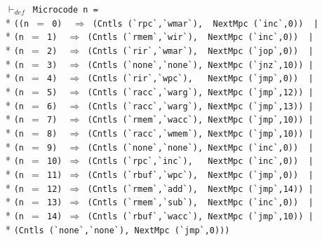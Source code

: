 \begin{normalsize}
\hspace*{\fill}
\begin{minipage}{17cm}
$\vdash_{def}$\verb" Microcode n ="\\*
\verb"((n "$=$\verb" 0)  "$\Rightarrow$\verb" (Cntls (`rpc`,`wmar`),  NextMpc (`inc`,0))  |"\\*
\verb"(n "$=$\verb" 1)  "$\Rightarrow$\verb" (Cntls (`rmem`,`wir`),  NextMpc (`inc`,0))  |"\\*
\verb"(n "$=$\verb" 2)  "$\Rightarrow$\verb" (Cntls (`rir`,`wmar`),  NextMpc (`jop`,0))  |"\\*
\verb"(n "$=$\verb" 3)  "$\Rightarrow$\verb" (Cntls (`none`,`none`), NextMpc (`jnz`,10)) |"\\*
\verb"(n "$=$\verb" 4)  "$\Rightarrow$\verb" (Cntls (`rir`,`wpc`),   NextMpc (`jmp`,0))  |"\\*
\verb"(n "$=$\verb" 5)  "$\Rightarrow$\verb" (Cntls (`racc`,`warg`), NextMpc (`jmp`,12)) |"\\*
\verb"(n "$=$\verb" 6)  "$\Rightarrow$\verb" (Cntls (`racc`,`warg`), NextMpc (`jmp`,13)) |"\\*
\verb"(n "$=$\verb" 7)  "$\Rightarrow$\verb" (Cntls (`rmem`,`wacc`), NextMpc (`jmp`,10)) |"\\*
\verb"(n "$=$\verb" 8)  "$\Rightarrow$\verb" (Cntls (`racc`,`wmem`), NextMpc (`jmp`,10)) |"\\*
\verb"(n "$=$\verb" 9)  "$\Rightarrow$\verb" (Cntls (`none`,`none`), NextMpc (`inc`,0))  |"\\*
\verb"(n "$=$\verb" 10) "$\Rightarrow$\verb" (Cntls (`rpc`,`inc`),   NextMpc (`inc`,0))  |"\\*
\verb"(n "$=$\verb" 11) "$\Rightarrow$\verb" (Cntls (`rbuf`,`wpc`),  NextMpc (`jmp`,0))  |"\\*
\verb"(n "$=$\verb" 12) "$\Rightarrow$\verb" (Cntls (`rmem`,`add`),  NextMpc (`jmp`,14)) |"\\*
\verb"(n "$=$\verb" 13) "$\Rightarrow$\verb" (Cntls (`rmem`,`sub`),  NextMpc (`inc`,0))  |"\\*
\verb"(n "$=$\verb" 14) "$\Rightarrow$\verb" (Cntls (`rbuf`,`wacc`), NextMpc (`jmp`,10)) |"\\*
\verb"(Cntls (`none`,`none`), NextMpc (`jmp`,0)))"
\end{minipage}
\hspace*{\fill}


\end{normalsize}
